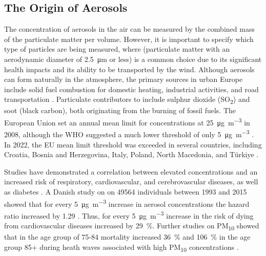 \subsection{The Origin of Aerosols}

The concentration of aerosols in the air can be measured by the combined mass of the particulate matter per volume. However, it is important to specify which type of particles are being measured, where \PM(particulate matter with an aerodynamic diameter of \SI{2.5}{\micro\meter} or less) is a common choice due to its significant health impacts and its ability to be transported by the wind. Although aerosols can form naturally in the atmosphere, the primary sources in urban Europe include solid fuel combustion for domestic heating, industrial activities, and road transportation \cite{europeanenvironmentagencyEuropesAirQuality2024}. Particulate contributors to \PM include sulphur dioxide (SO\textsubscript{2}) and soot (black carbon), both originating from the burning of fossil fuels. The European Union set an annual mean limit for \PM concentrations at \SI{25}{\micro\gram\per\cubic\meter} in 2008, although the WHO suggested a much lower threshold of only \SI{5}{\micro\gram\per\cubic\meter} \cite{europeanenvironmentagencyEuropesAirQuality2024}. In 2022, the EU mean limit threshold was exceeded in several countries, including Croatia, Bosnia and Herzegovina, Italy, Poland, North Macedonia, and Türkiye \cite{europeanenvironmentagencyEuropesAirQuality2024}. 

Studies have demonstrated a correlation between elevated \PM concentrations and an increased risk of respiratory, cardiovascular, and cerebrovascular diseases, as well as diabetes \cite{sharmaHealthEffectsAssociated2020}. A Danish study on on \SI{49564}{} individuals between 1993 and 2015 showed that for every \SI{5}{\micro\gram\per
\m\cubed} increase in aerosol concentrations the hazard ratio increased by 1.29 \cite{hvidtfeldtLongtermResidentialExposure2019}. Thus, for every \SI{5}{\micro\gram\per
\m\cubed} increase in \PM the risk of dying from cardiovascular diseases increased by \SI{29}{\%}. Further studies on PM\textsubscript{10} showed that in the age group of 75-84 mortality increased \SI{36}{\%} and \SI{106}{\%} in the age group 85+ during heath waves associated with high PM\textsubscript{10} concentrations \cite{analitisEffectsHeatWaves2014}.  


